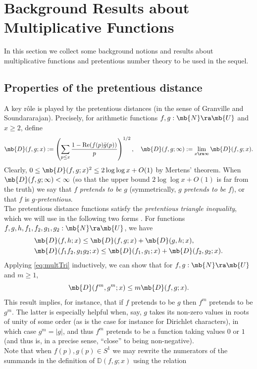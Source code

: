 \section{Background Results about Multiplicative Functions}
In this section we collect some background notions and results about multiplicative functions and pretentious number theory to be used in the sequel. 
\subsection{Properties of the pretentious distance}\label{subsec:pret}
A key r\^{o}le is played by the pretentious distances (in the sense of Granville and Soundararajan). Precisely, for arithmetic functions $f,g : \mb{N} \ra \mb{U}$ and $x \geq 2$, define
$$
\mb{D}(f,g;x) := \left(\sum_{p \leq x} \frac{1-\text{Re}(f(p)\bar{g}(p))}{p}\right)^{1/2}, \quad
%
%
\mb{D}(f,g;\infty) := \lim_{x \ra \infty} \mb{D}(f,g;x).
$$
%
Clearly, $0 \leq \mb{D}(f,g;x)^2 \leq 2\log\log x + O(1)$ by Mertens' theorem. When $\mb{D}(f,g;\infty) < \infty$ (so that the upper bound $2\log\log x + O(1)$ is far from the truth) we say that $f$ \emph{pretends to be} $g$ (symmetrically, $g$ \emph{pretends to be} $f$), or that $f$ is \emph{$g$-pretentious}. \\
The pretentious distance functions satisfy the \emph{pretentious triangle inequality}, which we will use in the following two forms \cite[Lem. 3.1]{GSPret}. For functions $f,g,h, f_1,f_2,g_1,g_2: \mb{N} \ra \mb{U} 
$, we have
\begin{align}
&\mb{D}(f,h;x) \leq \mb{D}(f,g;x) + \mb{D}(g,h;x), \label{eq:usualTri}\\
&\mb{D}(f_1f_2,g_1g_2;x) \leq \mb{D}(f_1,g_1;x) + \mb{D}(f_2,g_2;x).\label{eq:multTri}
\end{align}
Applying \eqref{eq:multTri} inductively, we can show that for $f,g : \mb{N} \ra \mb{U}$ and $m \geq 1$,
\begin{equation}\label{eq:pretTrimthPow}
\mb{D}(f^m,g^m;x) \leq m\mb{D}(f,g;x).
\end{equation}
This result implies, for instance, that if $f$ pretends to be $g$ then $f^m$ pretends to be $g^m$. The latter is especially helpful when, say, $g$ takes its non-zero values in roots of unity of some order  (as is the case for instance for Dirichlet characters), in which case $g^m = |g|$, and thus $f^m$ pretends to be a function taking values $0$ or $1$ (and thus is, in a precise sense, ``close'' to being non-negative). \\
Note that when $f(p),g(p) \in S^1$ we may rewrite the numerators of the summands in the definition of $\mathbb{D}(f,g;x)$ using the relation
